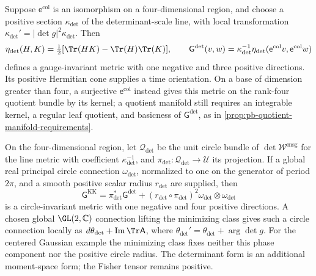 Suppose \(\mathsf e^{\mathrm{col}}\) is an isomorphism on a four-dimensional region, and choose
a positive section \(\kappa_{\det}\) of the determinant-scale line, with local transformation
\(\kappa_{\det}'=|\det g|^2\kappa_{\det}\). Then
\begin{equation}
\eta_{\det}(H,K)=\tfrac12[\Tr(HK)-\Tr(H)\Tr(K)],\qquad
\mathsf G^{\det}(v,w)=\kappa_{\det}^{-1}
\eta_{\det}(\mathsf e^{\mathrm{col}}v,\mathsf e^{\mathrm{col}}w)
\label{eq:pb-collective-determinant-metric}
\end{equation}
defines a gauge-invariant metric with one negative and three positive directions. Its positive
Hermitian cone supplies a time orientation. On a base of dimension greater than four, a surjective
\(\mathsf e^{\mathrm{col}}\) instead gives this metric on the rank-four quotient bundle by its
kernel; a quotient manifold still requires an integrable kernel, a regular leaf quotient, and
basicness of \(\mathsf G^{\det}\), as in \cref{prop:pb-quotient-manifold-requirements}.

On the four-dimensional region, let \(\mathscr Q_{\det}\) be the unit circle bundle of
\(\det\mathscr W^{\mathrm{msg}}\) for the line metric with coefficient
\(\kappa_{\det}^{-1}\), and \(\pi_{\det}:\mathscr Q_{\det}\to\mathcal U\) its projection.
If a global real principal circle connection \(\omega_{\det}\), normalized to one on the
generator of period \(2\pi\), and a smooth positive scalar radius \(r_{\det}\) are supplied,
then
\begin{equation}
\mathsf G^{\mathrm{KK}}=\pi_{\det}^*\mathsf G^{\det}
+(r_{\det}\circ\pi_{\det})^2\omega_{\det}\otimes\omega_{\det}
\label{eq:pb-collective-circle-completion}
\end{equation}
is a circle-invariant metric with one negative and four positive directions. A chosen global
\(\GL(2,\mathbb C)\) connection lifting the minimizing class gives such a circle connection
locally as \(d\theta_{\det}+\operatorname{Im}\Tr\mathsf A\), where
\(\theta_{\det}'=\theta_{\det}+\arg\det g\). For the centered Gaussian example the minimizing
class fixes neither this phase component nor the positive circle radius. The determinant form is
an additional moment-space form; the Fisher tensor remains positive. 


